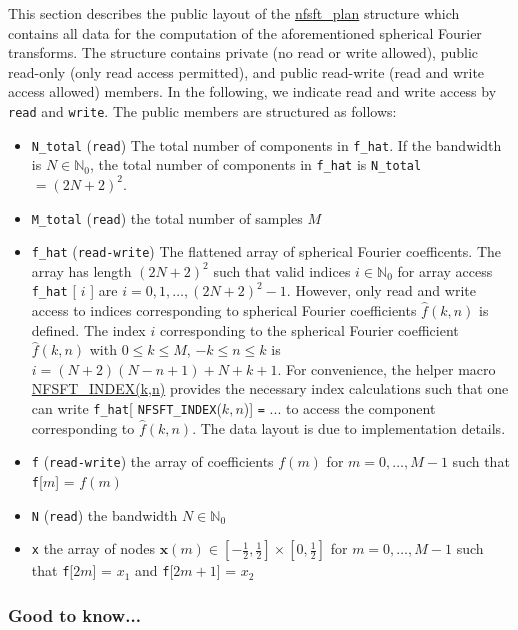 This section describes the public layout of the \hyperlink{structnfsft__plan}{nfsft\_\-plan} structure which contains all data for the computation of the aforementioned spherical Fourier transforms. The structure contains private (no read or write allowed), public read-only (only read access permitted), and public read-write (read and write access allowed) members. In the following, we indicate read and write access by {\tt read} and {\tt write}. The public members are structured as follows: \begin{itemize}
\item {\tt N\_\-total} ({\tt read}) The total number of components in {\tt f\_\-hat}. If the bandwidth is $N \in \mathbb{N}_0$, the total number of components in {\tt f\_\-hat} is {\tt N\_\-total} $ = (2N+2)^2$. \item {\tt M\_\-total} ({\tt read}) the total number of samples $M$ \item {\tt f\_\-hat} ({\tt read-write}) The flattened array of spherical Fourier coefficents. The array has length $(2N+2)^2$ such that valid indices $i \in \mathbb{N}_0$ for array access {\tt f\_\-hat} {\tt }\mbox{[} $i$ {\tt }\mbox{]} are $i=0,1,\ldots,(2N+2)^2-1$. However, only read and write access to indices corresponding to spherical Fourier coefficients $\hat{f}(k,n)$ is defined. The index $i$ corresponding to the spherical Fourier coefficient $\hat{f}(k,n)$ with $0 \le k \le M$, $-k \le n \le k$ is $i = (N+2)(N-n+1)+N+k+1$. For convenience, the helper macro \hyperlink{group__nfsft_g8be22087991e0a82cfa59a3f0f2a5e86}{NFSFT\_\-INDEX(k,n)} provides the necessary index calculations such that one can write {\tt f\_\-hat}\mbox{[} {\tt NFSFT\_\-INDEX}($k,n${\tt })\mbox{]} {\tt =} {\tt }... to access the component corresponding to $\hat{f}(k,n)$. The data layout is due to implementation details. \item {\tt f} ({\tt read-write}) the array of coefficients $f(m)$ for $m=0,\ldots,M-1$ such that {\tt f}\mbox{[}$m${\tt }\mbox{]} = $f(m)$ \item {\tt N} ({\tt read}) the bandwidth $N \in \mathbb{N}_0$ \item {\tt x} the array of nodes $\mathbf{x}(m) \in [-\frac{1}{2},\frac{1}{2}] \times [0,\frac{1}{2}]$ for $m = 0, \ldots,M-1$ such that {\tt f}\mbox{[}$2m${\tt }\mbox{]} = $x_1$ and {\tt f}\mbox{[}$2m+1${\tt }\mbox{]} = $x_2$\end{itemize}
\hypertarget{group__nfsft_gtn}{}\subsubsection{Good to know...}\label{group__nfsft_gtn}
